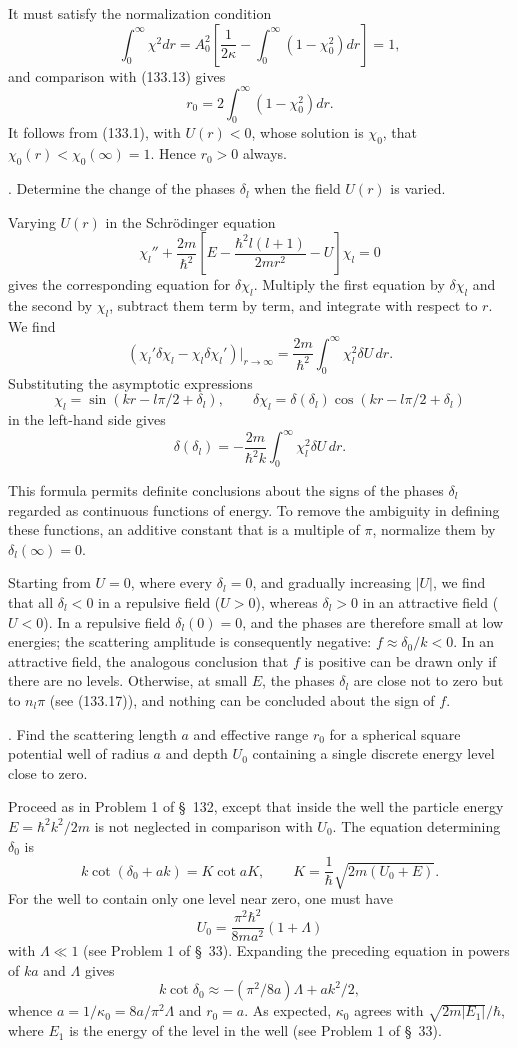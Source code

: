 It must satisfy the normalization condition
\[
 \int_0^\infty\chi^2dr=A_0^2\left[\frac1{2\kappa}-\int_0^\infty(1-\chi_0^2)dr\right]=1,
\]
and comparison with (133.13) gives
\[
 r_0=2\int_0^\infty(1-\chi_0^2)dr.
\]
It follows from (133.1), with $U(r)<0$, whose solution is $\chi_0$, that
$\chi_0(r)<\chi_0(\infty)=1$. Hence $r_0>0$ always.

. Determine the change of the phases $\delta_l$ when the
field $U(r)$ is varied.

\SolutionHeading Varying $U(r)$ in the Schrödinger equation
\[
 \chi_l''+\frac{2m}{\hbar^2}\left[E-\frac{\hbar^2l(l+1)}{2mr^2}-U\right]\chi_l=0
\]
gives the corresponding equation for $\delta\chi_l$. Multiply the first
equation by $\delta\chi_l$ and the second by $\chi_l$, subtract them term by
term, and integrate with respect to $r$. We find
\[
 (\chi_l'\delta\chi_l-\chi_l\delta\chi_l')|_{r\to\infty}
 =\frac{2m}{\hbar^2}\int_0^\infty\chi_l^2\delta U\,dr.
\]
Substituting the asymptotic expressions
\[
 \chi_l=\sin(kr-l\pi/2+\delta_l),\qquad
 \delta\chi_l=\delta(\delta_l)\cos(kr-l\pi/2+\delta_l)
\]
in the left-hand side gives
\[
 \delta(\delta_l)=-\frac{2m}{\hbar^2k}\int_0^\infty\chi_l^2\delta U\,dr.
\]

This formula permits definite conclusions about the signs of the phases
$\delta_l$ regarded as continuous functions of energy. To remove the
ambiguity in defining these functions, an additive constant that is a
multiple of $\pi$, normalize them by $\delta_l(\infty)=0$.

Starting from $U=0$, where every $\delta_l=0$, and gradually increasing
$|U|$, we find that all $\delta_l<0$ in a repulsive field ($U>0$), whereas
$\delta_l>0$ in an attractive field ($U<0$). In a repulsive field
$\delta_l(0)=0$, and the phases are therefore small at low energies; the
scattering amplitude is consequently negative:
$f\approx\delta_0/k<0$. In an attractive field, the analogous conclusion that
$f$ is positive can be drawn only if there are no levels. Otherwise, at small
$E$, the phases $\delta_l$ are close not to zero but to $n_l\pi$ (see
(133.17)), and nothing can be concluded about the sign of $f$.

. Find the scattering length $a$ and effective range $r_0$
for a spherical square potential well of radius $a$ and depth $U_0$ containing
a single discrete energy level close to zero.

\SolutionHeading Proceed as in Problem 1 of \S~132, except that inside the
well the particle energy $E=\hbar^2k^2/2m$ is not neglected in comparison
with $U_0$. The equation determining $\delta_0$ is
\[
 k\cot(\delta_0+ak)=K\cot aK,\qquad K=\frac1\hbar\sqrt{2m(U_0+E)}.
\]
For the well to contain only one level near zero, one must have
\[
 U_0=\frac{\pi^2\hbar^2}{8ma^2}(1+\Lambda)
\]
with $\Lambda\ll1$ (see Problem 1 of \S~33). Expanding the preceding equation
in powers of $ka$ and $\Lambda$ gives
\[
 k\cot\delta_0\approx-(\pi^2/8a)\Lambda+ak^2/2,
\]
whence $a=1/\kappa_0=8a/\pi^2\Lambda$ and $r_0=a$. As expected,
$\kappa_0$ agrees with $\sqrt{2m|E_1|}/\hbar$, where $E_1$ is the energy of
the level in the well (see Problem 1 of \S~33).


